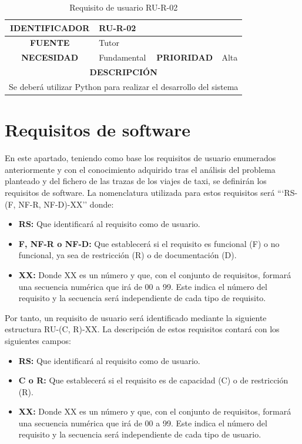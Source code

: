 \begin{table}[htp!]
\centering
\caption{Requisito de usuario RU-R-02}
\label{rur2}
\begin{tabular}{|c|l|c|l|}
\hline
\textbf{IDENTIFICADOR} & \multicolumn{3}{l|}{RU-R-02}            \\ \hline
\textbf{FUENTE}        & \multicolumn{3}{l|}{Tutor}              \\ \hline
\textbf{NECESIDAD}     & Fundamental & \textbf{PRIORIDAD} & Alta \\ \hline
\multicolumn{4}{|c|}{\textbf{DESCRIPCIÓN}}                       \\ \hline
\multicolumn{4}{|l|}{Se deberá utilizar Python para realizar el desarrollo del sistema}\\ \hline
\end{tabular}
\end{table}

\section{Requisitos de software}
En este apartado, teniendo como base los requisitos de usuario enumerados anteriormente y con el conocimiento adquirido tras el análisis del problema planteado y del fichero de las trazas de los viajes de taxi, se definirán los requisitos de software. La nomenclatura utilizada para estos requisitos será ```RS-(F, NF-R, NF-D)-XX'' donde:

\begin{itemize}
\item \textbf{RS:} Que identificará al requisito como de usuario.
\item \textbf{F, NF-R o NF-D:} Que establecerá si el requisito es funcional (F) o no funcional, ya sea de restricción (R) o de documentación (D).
\item \textbf{XX:} Donde XX es un número y que, con el conjunto de requisitos, formará una secuencia numérica que irá de 00 a 99. Este indica el número del requisito y la secuencia será independiente de cada tipo de requisito.
\end{itemize}

Por tanto, un requisito de usuario será identificado mediante la siguiente estructura RU-(C, R)-XX. La descripción de estos requisitos contará con los siguientes campos:

\begin{itemize}
\item \textbf{RS:} Que identificará al requisito como de usuario.
\item \textbf{C o R:} Que establecerá si el requisito es de capacidad (C) o de restricción (R).
\item \textbf{XX:} Donde XX es un número y que, con el conjunto de requisitos, formará una secuencia numérica que irá de 00 a 99. Este indica el número del requisito y la secuencia será independiente de cada tipo de usuario.
\end{itemize}


